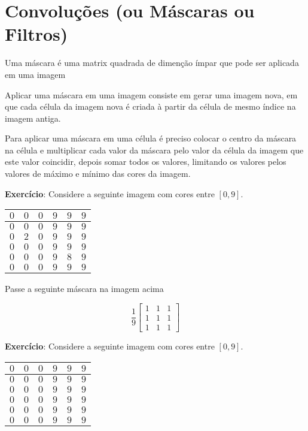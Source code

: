 \documentclass[12pt]{article}
\begin{document}





\section{Convoluções (ou Máscaras ou Filtros)}

Uma máscara é uma matrix quadrada de dimenção ímpar que pode ser aplicada em uma imagem

Aplicar uma máscara em uma imagem consiste em gerar uma imagem nova, em que cada célula da imagem nova é criada à partir da célula de mesmo índice na imagem antiga.

Para aplicar uma máscara em uma célula é preciso colocar o centro da máscara na célula e multiplicar cada valor da máscara pelo valor da célula da imagem que este valor coincidir, depois somar todos os valores, limitando os valores pelos valores de máximo e mínimo das cores da imagem.

\textbf{Exercício}: Considere a seguinte imagem com cores entre $[0, 9]$.

\begin{tabular}{|c|c|c|c|c|c|}
\hline
$0$ & $0$ & $0$ & $9$ & $9$ & $9$ \\ \hline
$0$ & $0$ & $0$ & $9$ & $9$ & $9$ \\ \hline
$0$ & $2$ & $0$ & $9$ & $9$ & $9$ \\ \hline
$0$ & $0$ & $0$ & $9$ & $9$ & $9$ \\ \hline
$0$ & $0$ & $0$ & $9$ & $8$ & $9$ \\ \hline
$0$ & $0$ & $0$ & $9$ & $9$ & $9$ \\ \hline

\end{tabular}

Passe a seguinte máscara na imagem acima

\[
\frac{1}{9}
\begin{bmatrix}
1 & 1 & 1\\
1 & 1 & 1\\
1 & 1 & 1
\end{bmatrix}
\]

\break

\textbf{Exercício}: Considere a seguinte imagem com cores entre $[0, 9]$.

\begin{tabular}{|c|c|c|c|c|c|}
\hline
$0$ & $0$ & $0$ & $9$ & $9$ & $9$ \\ \hline
$0$ & $0$ & $0$ & $9$ & $9$ & $9$ \\ \hline
$0$ & $0$ & $0$ & $9$ & $9$ & $9$ \\ \hline
$0$ & $0$ & $0$ & $9$ & $9$ & $9$ \\ \hline
$0$ & $0$ & $0$ & $9$ & $9$ & $9$ \\ \hline
$0$ & $0$ & $0$ & $9$ & $9$ & $9$ \\ \hline

\end{tabular}
\end{document}
